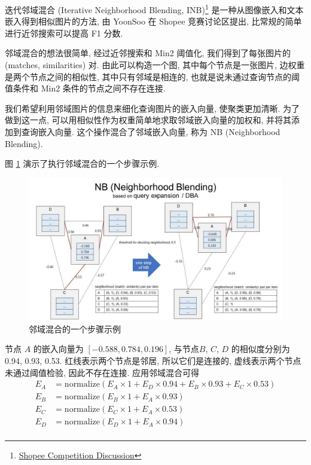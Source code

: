 \documentclass[12pt]{article}
\begin{document}
迭代邻域混合 (Iterative Neighborhood Blending, INB)\footnote{\href{https://www.kaggle.com/c/shopee-product-matching/discussion/238136}{Shopee Competition Discussion}} 是一种从图像嵌入和文本嵌入得到相似图片的方法, 由 YoonSoo 在 Shopee 竞赛讨论区提出, 比常规的简单进行近邻搜索可以提高 F1 分数.

邻域混合的想法很简单, 经过近邻搜索和 Min2 阈值化, 我们得到了每张图片的 (matches, similarities) 对. 由此可以构造一个图, 其中每个节点是一张图片, 边权重是两个节点之间的相似性, 其中只有邻域是相连的, 也就是说未通过查询节点的阈值条件和 Min2 条件的节点之间不存在连接.

我们希望利用邻域图片的信息来细化查询图片的嵌入向量, 使聚类更加清晰. 为了做到这一点, 可以用相似性作为权重简单地求取邻域嵌入向量的加权和, 并将其添加到查询嵌入向量. 这个操作混合了邻域嵌入向量, 称为 NB (Neighborhood Blending).

图 \ref{fig:neighblend} 演示了执行邻域混合的一个步骤示例.

\begin{figure}[htbp]
  \centering
  \includegraphics[width=16cm]{NB.JPG}
  \caption{邻域混合的一个步骤示例}
  \label{fig:neighblend}
\end{figure}

节点 $A$ 的嵌入向量为 $[-0.588,0.784,0.196]$, 与节点$B$, $C$, $D$ 的相似度分别为 0.94, 0.93, 0.53. 红线表示两个节点是邻居, 所以它们是连接的, 虚线表示两个节点未通过阈值检验, 因此不存在连接. 应用邻域混合可得
\begin{equation}
  \begin{aligned}
    E_A&=\text{normalize}(E_A\times1+E_D\times0.94+E_B\times0.93+E_C\times0.53)\\
    E_B&=\text{normalize}(E_B\times1+E_A\times0.93)\\
    E_C&=\text{normalize}(E_C\times1+E_A\times0.53)\\
    E_D&=\text{normalize}(E_D\times1+E_A\times0.94)\\
  \end{aligned}
\end{equation}
\end{document}
